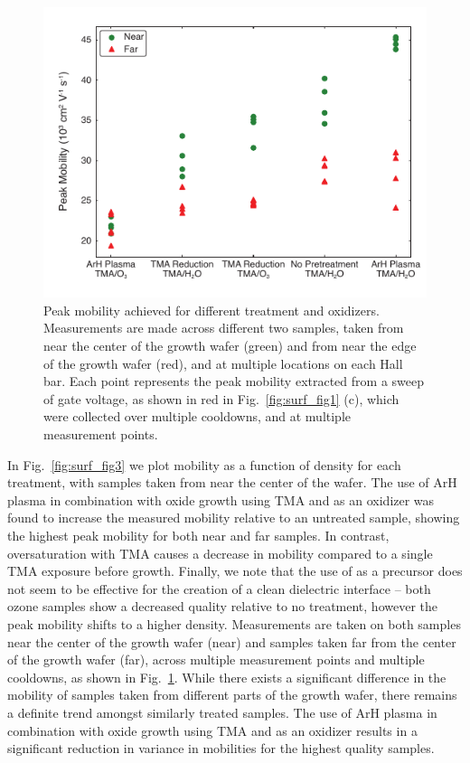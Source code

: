 \begin{figure}
\includegraphics[width=0.6\linewidth]{Figure4}
\caption[Peak mobilities for different treatments and oxidizers]{\label{fig:surf_fig4} Peak mobility achieved for different treatment and oxidizers. Measurements are made across different two samples, taken from near the center of the growth wafer (green) and from near the edge of the growth wafer (red), and at multiple locations on each Hall bar. Each point represents the peak mobility extracted from a sweep of gate voltage, as shown in red in Fig.~\ref{fig:surf_fig1} (c), which were collected over multiple cooldowns, and at multiple measurement points.}
\end{figure}

In Fig.~\ref{fig:surf_fig3} we plot mobility as a function of density for each treatment, with samples taken from near the center of the wafer. The use of ArH plasma in combination with oxide growth using TMA and  as an oxidizer was found to increase the measured mobility relative to an untreated sample, showing the highest peak mobility for both near and far samples. In contrast, oversaturation with TMA causes a decrease in mobility compared to a single TMA exposure before  growth. Finally, we note that the use of  as a precursor does not seem to be effective for the creation of a clean dielectric interface -- both ozone samples show a decreased quality relative to no treatment, however the peak mobility shifts to a higher density. Measurements are taken on both samples near the center of the growth wafer (near) and samples taken far from the center of the growth wafer (far), across multiple measurement points and multiple cooldowns, as shown in Fig.~\ref{fig:surf_fig4}. While there exists a significant difference in the mobility of samples taken from different parts of the growth wafer, there remains a definite trend amongst similarly treated samples. The use of ArH plasma in combination with oxide growth using TMA and  as an oxidizer results in a significant reduction in variance in mobilities for the highest quality samples.

